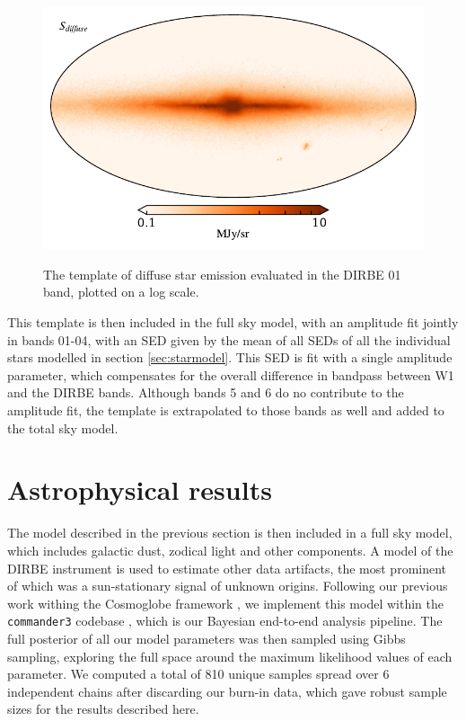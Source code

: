 \documentclass{aa}
\begin{document}
\begin{figure}
  \centering
  \includegraphics[width=\columnwidth]{figs/diffuseTemplate/diffuse_stars_log.pdf}\\
  \caption{The template of diffuse star emission evaluated in the DIRBE 01 band, plotted on a log scale.}
  \label{fig:diffuse}
\end{figure}

This template is then included in the full sky model, with an amplitude fit jointly in bands 01-04, with an SED given by the mean of all SEDs of all the individual stars modelled in section \ref{sec:starmodel}. This SED is fit with a single amplitude parameter, which compensates for the overall difference in bandpass between W1 and the DIRBE bands. Although bands 5 and 6 do no contribute to the amplitude fit, the template is extrapolated to those bands as well and added to the total sky model.

\section{Astrophysical results}
\label{sec:results}

The model described in the previous section is then included in a full sky model, which includes galactic dust, zodical light and other components. A model of the DIRBE instrument is used to estimate other data artifacts, the most prominent of which was a sun-stationary signal of unknown origins. Following our previous work withing the Cosmoglobe framework \citep{BP01, watts2023_dr1}, we implement this model within the \texttt{commander3} codebase \citep{BP03}, which is our Bayesian end-to-end analysis pipeline. The full posterior of all our model parameters was then sampled using Gibbs sampling, exploring the full space around the maximum likelihood values of each parameter. We computed a total of 810 unique samples spread over 6 independent chains after discarding our burn-in data, which gave robust sample sizes for the results described here. 
\end{document}
